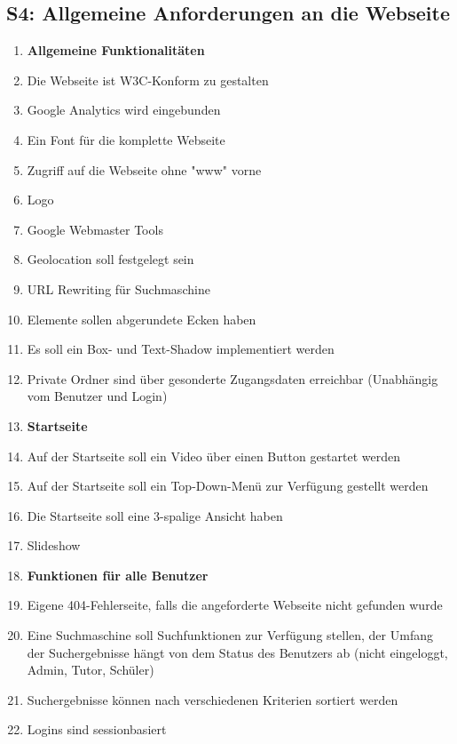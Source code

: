 \documentclass[10pt,a4paper]{scrartcl}
\begin{document}
\subsection{S4: Allgemeine Anforderungen an die Webseite}
\begin{enumerate}
\item[] \textbf{Allgemeine Funktionalitäten}
\item Die Webseite ist W3C-Konform zu gestalten
\item Google Analytics wird eingebunden
\item Ein Font für die komplette Webseite
\item Zugriff auf die Webseite ohne "www" vorne
\item Logo
\item Google Webmaster Tools
\item Geolocation soll festgelegt sein
\item URL Rewriting für Suchmaschine
\item Elemente sollen abgerundete Ecken haben
\item Es soll ein Box- und Text-Shadow implementiert werden
\item Private Ordner sind über gesonderte Zugangsdaten erreichbar (Unabhängig vom Benutzer und Login)

\item[] \textbf{Startseite}
\item Auf der Startseite soll ein Video über einen Button gestartet werden
\item Auf der Startseite soll ein Top-Down-Menü zur Verfügung gestellt werden
\item Die Startseite soll eine 3-spalige Ansicht haben
\item Slideshow

\item[] \textbf{Funktionen für alle Benutzer}
\item Eigene 404-Fehlerseite, falls die angeforderte Webseite nicht gefunden wurde
\item Eine Suchmaschine soll Suchfunktionen zur Verfügung stellen, der Umfang der Suchergebnisse hängt von dem Status des Benutzers ab (nicht eingeloggt, Admin, Tutor, Schüler)
\item Suchergebnisse können nach verschiedenen Kriterien sortiert werden
\item Logins sind sessionbasiert
\end{enumerate}



\end{document}

